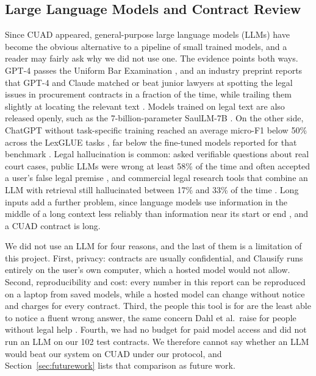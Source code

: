 \subsection{Large Language Models and Contract Review}
\label{sec:lit_llm}
Since CUAD appeared, general-purpose large language models (LLMs) have become the obvious alternative to a pipeline of small trained models, and a reader may fairly ask why we did not use one. The evidence points both ways. GPT-4 passes the Uniform Bar Examination \cite{katz2024gpt4bar}, and an industry preprint reports that GPT-4 and Claude matched or beat junior lawyers at spotting the legal issues in procurement contracts in a fraction of the time, while trailing them slightly at locating the relevant text \cite{martin2024bettercall}. Models trained on legal text are also released openly, such as the 7-billion-parameter SaulLM-7B \cite{colombo2024saullm}. On the other side, ChatGPT without task-specific training reached an average micro-F1 below 50\% across the LexGLUE tasks \cite{chalkidis2023chatgpt}, far below the fine-tuned models reported for that benchmark \cite{chalkidis2022lexglue}. Legal hallucination is common: asked verifiable questions about real court cases, public LLMs were wrong at least 58\% of the time and often accepted a user's false legal premise \cite{dahl2024fictions}, and commercial legal research tools that combine an LLM with retrieval still hallucinated between 17\% and 33\% of the time \cite{magesh2025hallucination}. Long inputs add a further problem, since language models use information in the middle of a long context less reliably than information near its start or end \cite{liu2024lost}, and a CUAD contract is long.

We did not use an LLM for four reasons, and the last of them is a limitation of this project. First, privacy: contracts are usually confidential, and Clausify runs entirely on the user's own computer, which a hosted model would not allow. Second, reproducibility and cost: every number in this report can be reproduced on a laptop from saved models, while a hosted model can change without notice and charges for every contract. Third, the people this tool is for are the least able to notice a fluent wrong answer, the same concern Dahl et al.\ raise for people without legal help \cite{dahl2024fictions}. Fourth, we had no budget for paid model access and did not run an LLM on our 102 test contracts. We therefore cannot say whether an LLM would beat our system on CUAD under our protocol, and Section~\ref{sec:futurework} lists that comparison as future work.

